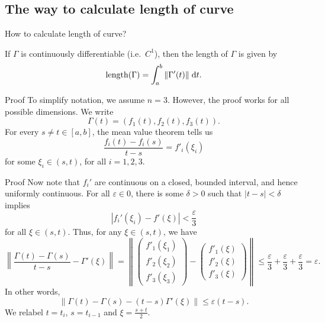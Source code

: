 \subsection{The way to calculate length of curve}

\begin{frame}{How to calculate length of curve?}
    \begin{prop}
      If $\Gamma$ is continuously differentiable (i.e.\ $C^1$), then the length of $\Gamma$ is given by
      \[
        \operatorname{length}(\Gamma) = \int_a^b \|\Gamma'(t)\|\;\mathrm{d} t.
      \]
    \end{prop}
\end{frame}

\begin{frame}{Proof}
    To simplify notation, we assume $n = 3$. However, the proof works for all possible dimensions. We write
      \[
        \Gamma(t) = (f_1(t), f_2(t), f_3(t)).
      \]
      For every $s \not= t \in [a, b]$, the mean value theorem tells us
      \[
        \frac{f_i(t) - f_i(s)}{t - s} = f'_i (\xi_i)
      \]
      for some $\xi_i \in (s, t)$, for all $i = 1, 2, 3$.
\end{frame}

\begin{frame}{Proof}
    Now note that $f_i'$ are continuous on a closed, bounded interval, and hence uniformly continuous. For all $\varepsilon \in 0$, there is some $\delta > 0$ such that $|t - s| < \delta$ implies
          \[
            |f_i'(\xi_i) - f'(\xi)| < \frac{\varepsilon}{3}
          \]
          for all $\xi \in (s, t)$. Thus, for any $\xi \in (s, t)$, we have
          \[
            \left\|\frac{\Gamma(t) - \Gamma(s)}{t - s} - \Gamma'(\xi)\right\| = \left\|\begin{pmatrix}f'_1(\xi_1)\\ f'_2(\xi_2)\\ f'_3(\xi_3)\end{pmatrix} - \begin{pmatrix}f'_1(\xi)\\ f'_2(\xi)\\ f'_3(\xi)\end{pmatrix}\right\| \leq \frac{\varepsilon}{3} + \frac{\varepsilon}{3} + \frac{\varepsilon}{3} = \varepsilon.
          \]
          In other words,
          \[
            \|\Gamma(t) - \Gamma(s) - (t - s) \Gamma'(\xi)\| \leq \varepsilon(t - s).
          \]
          We relabel $t = t_i$, $s = t_{i - 1}$ and $\xi = \frac{s + t}{2}$.
\end{frame}


